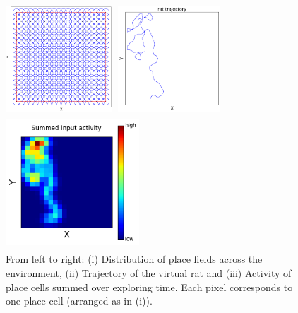 \documentclass[a4paper, 12pt]{article}
\begin{document}
\begin{figure}[h]\label{input}
\setlength{\abovecaptionskip}{5pt}
\setlength{\belowcaptionskip}{0pt}
\begin{minipage}[t]{0.3\textwidth}\vspace{0pt}
\includegraphics[width=4cm, height=4cm]{pics/place_cell_locations}
\end{minipage}\hfill%
\begin{minipage}[t]{0.3\textwidth}\vspace{0pt}
\includegraphics[width=4cm, height=4cm]{pics/mouse_demo}
\end{minipage}\hfill
\begin{minipage}[t]{0.3\textwidth}\vspace{0pt}
\includegraphics[width=5cm, height=5cm]{pics/activity_demo}
\end{minipage}
\caption{\footnotesize{From left to right: (i) Distribution of place fields across the environment, (ii) Trajectory of the virtual rat and (iii) Activity of place cells summed over exploring time. Each pixel corresponds to one place cell (arranged as in (i)).}}
\end{figure}
%
%
%	
\end{document}
